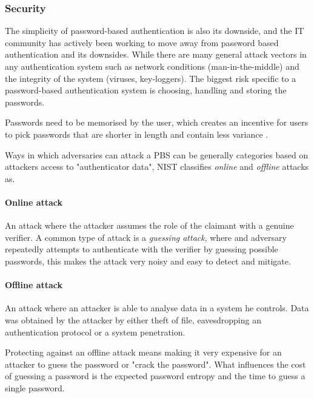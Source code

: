 \subsubsection{Security}

The simplicity of password-based authentication is also its downside, and the IT community has actively been working to move away from password based authentication and its downsides.
While there are many general attack vectors in any authentication system such as network conditions (man-in-the-middle) and the integrity of the system (viruses, key-loggers). The biggest risk specific to a password-based authentication system is choosing, handling and storing the passwords. %

Passwords need to be memorised by the user, which creates an incentive for users to pick passwords that are shorter in length and contain less variance \cite{conklin2004password}. %

Ways in which adversaries can attack a PBS can be generally categories based on attackers access to "authenticator data", NIST \cite{grassi2017} classifies \textit{online} and \textit{offline} attacks as. %

\paragraph{Online attack} An attack where the attacker assumes the role of the claimant with a genuine verifier.
A common type of attack is a \textit{guessing attack}, where and adversary repeatedly attempts to authenticate with the verifier by guessing possible passwords, this makes the attack very noisy and easy to detect and mitigate.


\paragraph{Offline attack} An attack where an attacker is able to analyse data in a system he controls. Data was obtained by the attacker by either theft of file, eavesdropping an authentication protocol or a system penetration.

Protecting against an offline attack means making it very expensive for an attacker to guess the password or "crack the password".
What influences the cost of guessing a password is the expected password entropy and the time to guess a single password.

